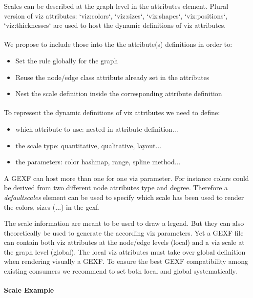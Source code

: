 \documentclass[a4paper,10pt]{article}
\begin{document}
Scales can be described at the graph level in the attributes element.
Plural version of viz attributes: `viz:colors`, `viz:sizes`, `viz:shapes`, `viz:positions`, `viz:thicknesses` are used to host the dynamic definitions of viz attributes.

\paragraph{}
We propose to include those into the the attribute(s) definitions in order to:
\begin{itemize}
\item Set the rule globally for the graph
\item Reuse the node/edge class attribute already set in the attributes
\item Nest the scale definition inside the corresponding attribute definition
\end{itemize}

\paragraph{}
To represent the dynamic definitions of viz attributes we need to define:
\begin{itemize}
\item which attribute to use: nested in attribute definition...
\item the scale type: quantitative, qualitative, layout...
\item the parameters: color hashmap, range, spline method...
\end{itemize}

A GEXF can host more than one for one viz parameter. For instance colors could be derived from two different node attributes type and degree. Therefore a \textit{defaultscales} element can be used to specify which scale has been used to render the colors, sizes (...) in the gexf.

The scale information are meant to be used to draw a legend. But they can also theoretically be used to generate the according viz parameters.
Yet a GEXF file can contain both viz attributes at the node/edge levels (local) and a viz scale at the graph level (global).
The local viz attributes must take over global definition when rendering visually a GEXF.
To ensure the best GEXF compatibility among existing consumers we recommend to set both local and global systematically.

\paragraph{Scale Example}
\end{document}
